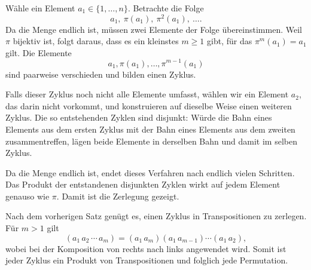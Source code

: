 
\begin{myproof}
Wähle ein Element \(a_1\in\{1,\ldots,n\}\). Betrachte die Folge
\[
a_1,\ \pi(a_1),\ \pi^2(a_1),\ \ldots.
\]
Da die Menge endlich ist, müssen zwei Elemente der Folge übereinstimmen. Weil \(\pi\) bijektiv ist, folgt daraus, dass es ein kleinstes \(m\geq1\) gibt, für das \(\pi^m(a_1)=a_1\) gilt. Die Elemente
\[
a_1,\pi(a_1),\ldots,\pi^{m-1}(a_1)
\]
sind paarweise verschieden und bilden einen Zyklus.

Falls dieser Zyklus noch nicht alle Elemente umfasst, wählen wir ein Element \(a_2\), das darin nicht vorkommt, und konstruieren auf dieselbe Weise einen weiteren Zyklus. Die so entstehenden Zyklen sind disjunkt: Würde die Bahn eines Elements aus dem ersten Zyklus mit der Bahn eines Elements aus dem zweiten zusammentreffen, lägen beide Elemente in derselben Bahn und damit im selben Zyklus.

Da die Menge endlich ist, endet dieses Verfahren nach endlich vielen Schritten. Das Produkt der entstandenen disjunkten Zyklen wirkt auf jedem Element genauso wie \(\pi\). Damit ist die Zerlegung gezeigt.
\end{myproof}


\begin{myproof}
Nach dem vorherigen Satz genügt es, einen Zyklus in Transpositionen zu zerlegen. Für \(m>1\) gilt
\[
(a_1\,a_2\,\cdots\,a_m)
=(a_1\,a_m)(a_1\,a_{m-1})\cdots(a_1\,a_2),
\]
wobei bei der Komposition von rechts nach links angewendet wird. Somit ist jeder Zyklus ein Produkt von Transpositionen und folglich jede Permutation.
\end{myproof}


